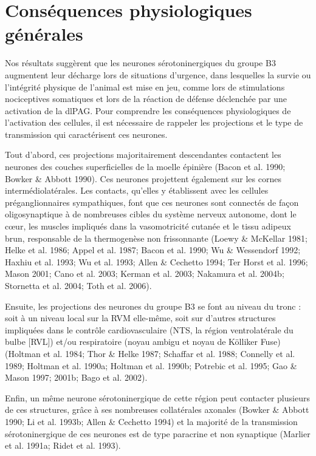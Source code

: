 \documentclass[a4paper,12pt,twoside]{report}
\begin{document}
\section{Conséquences physiologiques générales}

Nos résultats suggèrent que les neurones sérotoninergiques du groupe B3 augmentent leur décharge lors de situations d’urgence, dans lesquelles la survie ou l’intégrité physique de l’animal est mise en jeu, comme lors de stimulations nociceptives somatiques et lors de la réaction de défense déclenchée par une activation de la dlPAG. Pour comprendre les conséquences physiologiques de l’activation des cellules, il est nécessaire de rappeler les projections et le type de transmission qui caractérisent ces neurones. 

Tout d’abord, ces projections majoritairement descendantes contactent les neurones des couches superficielles de la moelle épinière (Bacon et al. 1990; Bowker \& Abbott 1990). Ces neurones projettent également sur les cornes intermédiolatérales. Les contacts, qu’elles y établissent avec les cellules préganglionnaires sympathiques, font que ces neurones sont connectés de façon oligosynaptique à de nombreuses cibles du système nerveux autonome, dont le cœur, les muscles impliqués dans la vasomotricité cutanée et le tissu adipeux brun, responsable de la thermogenèse non frissonnante (Loewy \& McKellar 1981; Helke et al. 1986; Appel et al. 1987; Bacon et al. 1990; Wu \& Wessendorf 1992; Haxhiu et al. 1993; Wu et al. 1993; Allen \& Cechetto 1994; Ter Horst et al. 1996; Mason 2001; Cano et al. 2003; Kerman et al. 2003; Nakamura et al. 2004b; Stornetta et al. 2004; Toth et al. 2006). 

Ensuite, les projections des neurones du groupe B3 se font au niveau du tronc : soit à un niveau local sur la RVM elle-même, soit sur d’autres structures impliquées dans le contrôle cardiovasculaire (NTS, la région ventrolatérale du bulbe [RVL]) et/ou respiratoire (noyau ambigu et noyau de Kölliker Fuse) (Holtman et al. 1984; Thor \& Helke 1987; Schaffar et al. 1988; Connelly et al. 1989; Holtman et al. 1990a; Holtman et al. 1990b; Potrebic et al. 1995; Gao \& Mason 1997; 2001b; Bago et al. 2002). 

Enfin, un même neurone sérotoninergique de cette région peut contacter plusieurs de ces structures, grâce à ses nombreuses collatérales axonales (Bowker \& Abbott 1990; Li et al. 1993b; Allen \& Cechetto 1994) et la majorité de la transmission sérotoninergique de ces neurones est de type paracrine et non synaptique (Marlier et al. 1991a; Ridet et al. 1993).
\end{document}
